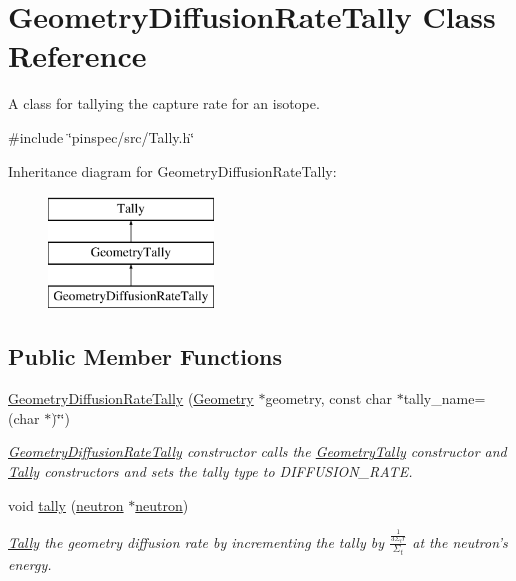 \hypertarget{classGeometryDiffusionRateTally}{\section{Geometry\-Diffusion\-Rate\-Tally Class Reference}
\label{classGeometryDiffusionRateTally}
}


A class for tallying the capture rate for an isotope.  




{\ttfamily \#include \char`\"{}pinspec/src/\-Tally.\-h\char`\"{}}

Inheritance diagram for Geometry\-Diffusion\-Rate\-Tally\-:\begin{figure}[H]
\begin{center}
\leavevmode
\includegraphics[height=3.000000cm]{classGeometryDiffusionRateTally}
\end{center}
\end{figure}
\subsection*{Public Member Functions}
\begin{DoxyCompactItemize}
\item 
\hyperlink{classGeometryDiffusionRateTally_ad7813cacc07a6833a25dfddba0ee7cf4}{Geometry\-Diffusion\-Rate\-Tally} (\hyperlink{classGeometry}{Geometry} $\ast$geometry, const char $\ast$tally\-\_\-name=(char $\ast$)\char`\"{}\char`\"{})
\begin{DoxyCompactList}\small\item\em \hyperlink{classGeometryDiffusionRateTally}{Geometry\-Diffusion\-Rate\-Tally} constructor calls the \hyperlink{classGeometryTally}{Geometry\-Tally} constructor and \hyperlink{classTally}{Tally} constructors and sets the tally type to D\-I\-F\-F\-U\-S\-I\-O\-N\-\_\-\-R\-A\-T\-E. \end{DoxyCompactList}\item 
void \hyperlink{classGeometryDiffusionRateTally_aab31c320a689adb46c888bd68df49ad4}{tally} (\hyperlink{structneutron}{neutron} $\ast$\hyperlink{structneutron}{neutron})
\begin{DoxyCompactList}\small\item\em \hyperlink{classTally}{Tally} the geometry diffusion rate by incrementing the tally by $ \frac{\frac{1}{3\Sigma_tr}}{\Sigma_t} $ at the neutron's energy. \end{DoxyCompactList}\end{DoxyCompactItemize}

